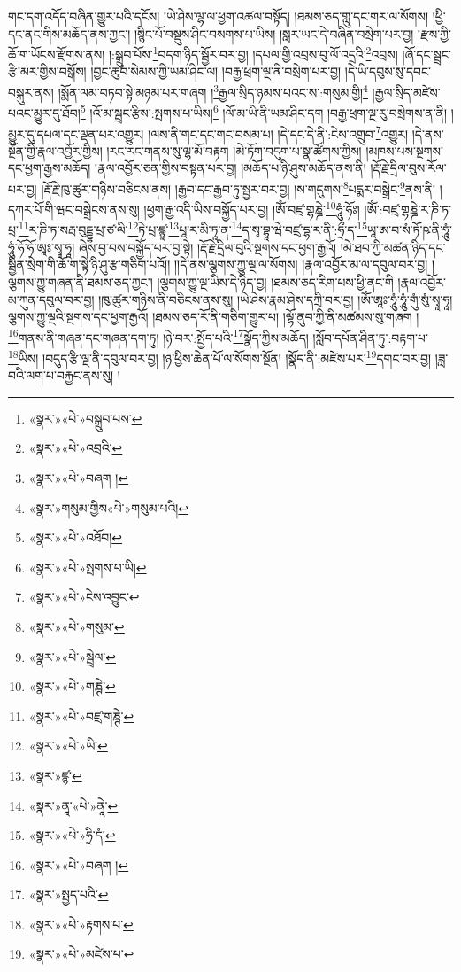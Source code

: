 གང་དག་འདོད་བཞིན་གྱུར་པའི་དངོས། །ཡེ་ཤེས་ལྷ་ལ་ཕྱག་འཚལ་བསྟོད། །ཐམས་ཅད་གླུ་དང་གར་ལ་སོགས། །ཕྱི་དང་ནང་གིས་མཆོད་ནས་ཀྱང་། །སྙིང་པོ་བསྡུས་ཤིང་བསགས་པ་ཡིས། །སླར་ཡང་དེ་བཞིན་བསྲེག་པར་བྱ། །རྫས་ཀྱི་ཆོ་ག་ཡོངས་རྫོགས་ནས། །:སྒྲུབ་པོས་\footnote{«སྣར་»«པེ་»བསྒྲུབ་པས་}བདག་ཉིད་སྦྱོར་བར་བྱ། །དཔལ་གྱི་འབྲས་བུ་ལོ་འདྲའི་\footnote{«སྣར་»«པེ་»འབྲའི་}འབྲས། །ཞོ་དང་སྦྲང་རྩི་མར་གྱིས་བསྒོས། །བྱང་ཆུབ་སེམས་ཀྱི་ཡམ་ཤིང་ལ། །བརྒྱ་ཕྲག་ལྔ་ནི་བསྲེག་པར་བྱ། །དེ་ཡི་དབུས་སུ་དབང་བསྐུར་ནས། །སྨོན་ལམ་བཏབ་སྟེ་མཉམ་པར་གཞག །\footnote{«སྣར་»«པེ་»བཞག །}རྒྱལ་སྲིད་ཉམས་པའང་ས་:གསུམ་གྱི།\footnote{«སྣར་»གསུམ་གྱིས«པེ་»གསུམ་པའི།} །རྒྱལ་སྲིད་མཛེས་པའང་མྱུར་དུ་ཐོབ།\footnote{«སྣར་»«པེ་»འཐོབ།} །འོ་མ་སྦྲང་རྩིས་:སྤགས་པ་ཡིས།\footnote{«སྣར་»«པེ་»སྤགས་པ་ཡི།} །ལོ་མ་ཡི་ནི་ཡམ་ཤིང་དག །བརྒྱ་ཕྲག་ལྔ་རུ་བསྲེགས་ན་ནི། །མྱུར་དུ་དཔལ་དང་ལྡན་པར་འགྱུར། །ལས་ནི་གང་དང་གང་བསམ་པ། །དེ་དང་དེ་ནི་:ངེས་འགྲུབ་\footnote{«སྣར་»«པེ་»ངེས་འབྱུང་}འགྱུར། །དེ་ནས་སྔོན་གྱི་རྣལ་འབྱོར་གྱིས། །རང་རང་གནས་སུ་ལྷ་མོ་བརྟག །མེ་ཏོག་བདུག་པ་སྣ་ཚོགས་ཀྱིས། །མཁས་པས་སྔགས་དང་ཕྱག་རྒྱས་མཆོད། །རྣལ་འབྱོར་ཅན་གྱིས་བསྟན་པར་བྱ། །མཆོད་པ་ཉི་ཤུས་མཆོད་ནས་ནི། །རྡོ་རྗེ་དྲིལ་བུས་རོལ་པར་བྱ། །རྡོ་རྗེ་ཁུ་ཚུར་གཉིས་བཅིངས་ནས། །རྒྱབ་དང་རྒྱབ་ཏུ་སྦྱར་བར་བྱ། །ས་གདུགས་\footnote{«སྣར་»«པེ་»གསུམ་}པདྨར་བསྒྲེང་\footnote{«སྣར་»«པེ་»སྦྲེལ་}ནས་ནི། །དཀར་པོ་གི་ཝང་བསྒྲེངས་ནས་སུ། །ཕྱག་རྒྱ་འདི་ཡིས་བསྐྱོད་པར་བྱ། །ཨོཾ་བཛྲ་གྷཎྜེ་\footnote{«སྣར་»«པེ་»གཎྚེ་}ཧཱུཾ་ཧོཿ། །ཨོཾ་:བཛྲ་གྷཎྜེ་ར་ཎི་ཏ་པྲ་\footnote{«སྣར་»«པེ་»བཛྲ་གཎྚེ་}ར་ཎི་ཏ་སརྦ་བུདྡྷ་པྲ་ཙ་ལི་\footnote{«སྣར་»«པེ་»ཡི་}ཏེ་པྲ་ཛྙཱ་\footnote{«སྣར་»ཛྙ་}པཱ་ར་མི་ཏཱ་ན་\footnote{«སྣར་»ནཱ་«པེ་»ནཱེ་}ད་སྭ་བྷཱ་ཝེ་བཛྲ་དྷ་ར་ནི་:ཧྲྀ་ད་\footnote{«སྣར་»«པེ་»ཧྲི་དཾ་}ཡཱ་ཨ་བ་སཾ་ཏོ་ཥ་ནི་ཧཱུཾ་ཧཱུཾ་ཧོ་ཧོ་ཨཱཿ་སྭཱ་ཧཱ། ཞེས་བྱ་བས་བསྐྱོད་པར་བྱ་སྟེ། །རྡོ་རྗེ་དྲིལ་བུའི་སྔགས་དང་ཕྱག་རྒྱའོ། །མེ་ཐབ་ཀྱི་མཚན་ཉིད་དང་སྦྱིན་སྲེག་གི་ཆོ་ག་སྟེ་ཉི་ཤུ་རྩ་གཅིག་པའོ།། །།དེ་ནས་ལྕགས་ཀྱུ་ལྔ་ལ་སོགས། །རྣལ་འབྱོར་མ་ལ་དབུལ་བར་བྱ། །ལྕགས་ཀྱུ་གཞན་ནི་ཐམས་ཅད་ཀྱང་། །ལྕགས་ཀྱུ་ལྔ་ཡིས་དེ་ཉིད་བྱ། །ཐམས་ཅད་རིག་པས་ཕྱི་ནང་གི །རྣལ་འབྱོར་མ་ཀུན་དབུལ་བར་བྱ། །ཁུ་ཚུར་གཉིས་ནི་བཅིངས་ནས་སུ། །ཡེ་ཤེས་རྣམ་ཤེས་དཀྲི་བར་བྱ། །ཨོཾ་ཨཱཿ་ཧཱུཾ་ཧཱུཾ་གུཾ་སུཾ་སྭཱ་ཧཱ། ལྕགས་ཀྱུ་ལྔའི་སྔགས་དང་ཕྱག་རྒྱའོ། །ཐམས་ཅད་རོ་ནི་གཅིག་གྱུར་པ། །ལྷོ་ནུབ་ཀྱི་ནི་མཚམས་སུ་གཞག །\footnote{«སྣར་»«པེ་»བཞག །}གནས་ནི་གཞན་དང་གཞན་དག་ཏུ། །ཉེ་བར་:སྤྱོད་པའི་\footnote{«སྣར་»སྤྱད་པའི་}སྣོད་ཀྱིས་མཆོད། །སློབ་དཔོན་ཤིན་ཏུ་:བརྟག་པ་\footnote{«སྣར་»«པེ་»རྟགས་པ་}ཡིས། །བདུད་རྩི་ལྔ་ནི་དབུལ་བར་བྱ། །ཉ་ཕྱིས་ཆེན་པོ་ལ་སོགས་སྔོན། །སྣོད་ནི་:མཛེས་པར་\footnote{«སྣར་»«པེ་»མཛེས་པ་}དགང་བར་བྱ། །ཟླ་བའི་ལག་པ་བརྐྱང་ནས་སུ། །
